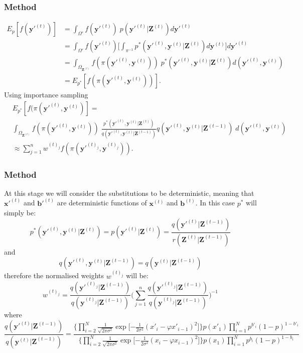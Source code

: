 \documentclass[9pt]{beamer}
\begin{document}
\begin{frame}
\frametitle{Method}
\begin{align*}
E_{p}[f(\bm{y'}^{(t)})]  &= \int_{\Omega'} f(\bm{y'}^{(t)})\; p(\bm{y'}^{(t)} | \bm{Z}^{(t)}) d \bm{y'}^{(t)} \\
&= \int_{\Omega'} f(\bm{y'}^{(t)})\Bigg[\int_{\pi^{-1}} p^*(\bm{y'}^{(t)}, \bm{y}^{(t)} | \bm{Z}^{(t)}) d\bm{y}^{(t)}\Bigg] d\bm{y'}^{(t)} \\ 
&= \int_{\Omega_{\bm{Z}^{(t)}}} f(\pi(\bm{y'}^{(t)}, \bm{y}^{(t)}))\; p^*(\bm{y'}^{(t)}, \bm{y}^{(t)} | \bm{Z}^{(t)}) d(\bm{y'}^{(t)},\bm{y}^{(t)}) \\
&= E_{p^*}[f(\pi (\bm{y'}^{(t)}, \bm{y}^{(t)}))].
\end{align*}
Using importance sampling
\begin{align*}
&E_{p^*}[f(\pi (\bm{y'}^{(t)}, \bm{y}^{(t)})] = \\
& \int_{\Omega_{\bm{Z}^{(t)}}} f(\pi(\bm{y'}^{(t)},  \bm{y}^{(t)})) \; \frac{p^*(\bm{y'}^{(t)}, \bm{y}^{(t)}|\bm{Z}^{(t)})}{q(\bm{y'}^{(t)}, \bm{y}^{(t)} | \bm{Z}^{(t-1)})} q(\bm{y'}^{(t)}, \bm{y}^{(t)} | \bm{Z}^{(t-1)})\; d(\bm{y'}^{(t)}, \bm{y}^{(t)}) \\ &\approx \sum_{j=1}^n  w^{(t)_j}f(\pi (\bm{y'}^{(t)_j}, \bm{y}^{(t)_j})).
\end{align*}
\end{frame}

\begin{frame}
\frametitle{Method}
At this stage we will consider the substitutions to be deterministic, meaning that $\bm{x'}^{(t)}$ and $\bm{b'}^{(t)}$ are deterministic functions of $\bm{x}^{(t)}$ and $\bm{b}^{(t)}$. In this case $p^*$ will simply be:
\[
p^*(\bm{y'}^{(t)}, \bm{y}^{(t)} | \bm{Z}^{(t)}) = p(\bm{y'}^{(t)} | \bm{Z}^{(t)}) = \frac{ q(\bm{y'}^{(t)}|\bm{Z}^{(t-1)})} {r(\bm{Z}^{(t)} | \bm{Z}^{(t-1)})}
\]
and
\[
q(\bm{y'}^{(t)}, \bm{y}^{(t)} | \bm{Z}^{(t-1)}) = q(\bm{y}^{(t)} | \bm{Z}^{(t-1)})
\]
therefore the normalised weights $w^{(t)_j}$ will be:
\[
w^{(t)_j} = \frac{q(\bm{y'}^{(t)_j} | \bm{Z}^{(t-1)}) }{q(\bm{y}^{(t)_j} | \bm{Z}^{(t-1)})}\Bigg( \sum_{j=1}^n  \frac{q(\bm{y'}^{(t)_j} | \bm{Z}^{(t-1)}) }{q(\bm{y}^{(t)_j} | \bm{Z}^{(t-1)})}\Bigg)^{-1}
\]
where
\[
\frac{q(\bm{y'}^{(t)} | \bm{Z}^{(t-1)}) }{q(\bm{y}^{(t)} | \bm{Z}^{(t-1)})} = \frac{\bigg \{ \prod_{i=2}^{N}  \frac{1}{\sqrt{2 \pi \sigma^{2}}} \exp \bigg [ { - \frac{1}{2 \sigma^{2}} }  (x'_{i} - \varphi x'_{i-1})^{2} \bigg ] \bigg \} p(x'_{1}) \prod_{i=1}^{N} p^{b'_i} (1 - p)^{1-b'_{i}}  }{\bigg \{ \prod_{i=2}^{N}  \frac{1}{\sqrt{2 \pi \sigma^{2}}} \exp \bigg [ { - \frac{1}{2 \sigma^{2}} }  (x_{i} - \varphi x_{i-1})^{2} \bigg ] \bigg \} p(x_{1}) \prod_{i=1}^{N} p^{b_i} (1 - p)^{1-b_{i}} }
\]
\end{frame}
\end{document}
